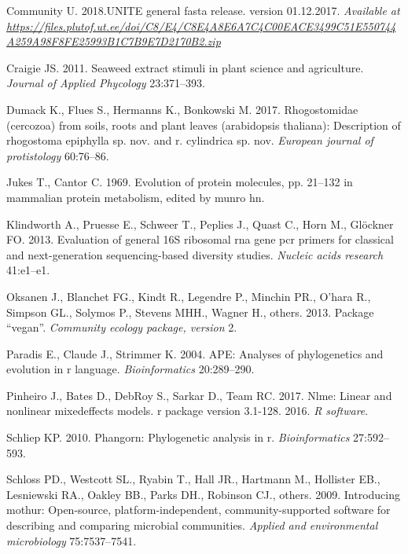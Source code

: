 \documentclass[11pt,]{article}
\begin{document}
\hypertarget{ref-UNITE2017}{}
Community U. 2018.UNITE general fasta release. version 01.12.2017.
\emph{Available at}
\emph{\url{https://files.plutof.ut.ee/doi/C8/E4/C8E4A8E6A7C4C00EACE3499C51E550744A259A98F8FE25993B1C7B9E7D2170B2.zip}}

\hypertarget{ref-craigie2011seaweed}{}
Craigie JS. 2011. Seaweed extract stimuli in plant science and
agriculture. \emph{Journal of Applied Phycology} 23:371--393.

\hypertarget{ref-dumack2017rhogostomidae}{}
Dumack K., Flues S., Hermanns K., Bonkowski M. 2017. Rhogostomidae
(cercozoa) from soils, roots and plant leaves (arabidopsis thaliana):
Description of rhogostoma epiphylla sp. nov. and r. cylindrica sp. nov.
\emph{European journal of protistology} 60:76--86.

\hypertarget{ref-jukes1969evolution}{}
Jukes T., Cantor C. 1969. Evolution of protein molecules, pp. 21--132 in
mammalian protein metabolism, edited by munro hn.

\hypertarget{ref-klindworth2013evaluation}{}
Klindworth A., Pruesse E., Schweer T., Peplies J., Quast C., Horn M.,
Glöckner FO. 2013. Evaluation of general 16S ribosomal rna gene pcr
primers for classical and next-generation sequencing-based diversity
studies. \emph{Nucleic acids research} 41:e1--e1.

\hypertarget{ref-oksanen2013package}{}
Oksanen J., Blanchet FG., Kindt R., Legendre P., Minchin PR., O'hara R.,
Simpson GL., Solymos P., Stevens MHH., Wagner H., others. 2013. Package
``vegan''. \emph{Community ecology package, version} 2.

\hypertarget{ref-paradis2004ape}{}
Paradis E., Claude J., Strimmer K. 2004. APE: Analyses of phylogenetics
and evolution in r language. \emph{Bioinformatics} 20:289--290.

\hypertarget{ref-pinheiro2017nlme}{}
Pinheiro J., Bates D., DebRoy S., Sarkar D., Team RC. 2017. Nlme: Linear
and nonlinear mixedeffects models. r package version 3.1-128. 2016.
\emph{R software}.

\hypertarget{ref-schliep2010phangorn}{}
Schliep KP. 2010. Phangorn: Phylogenetic analysis in r.
\emph{Bioinformatics} 27:592--593.

\hypertarget{ref-schloss2009introducing}{}
Schloss PD., Westcott SL., Ryabin T., Hall JR., Hartmann M., Hollister
EB., Lesniewski RA., Oakley BB., Parks DH., Robinson CJ., others. 2009.
Introducing mothur: Open-source, platform-independent,
community-supported software for describing and comparing microbial
communities. \emph{Applied and environmental microbiology}
75:7537--7541.
\end{document}

